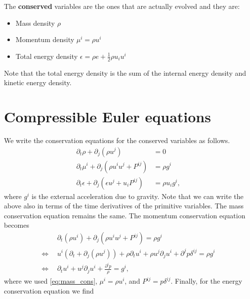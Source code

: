 \documentclass{article}
\begin{document}
The \textbf{conserved} variables are the ones that are actually evolved and they are:
\begin{itemize}
  \item Mass density $\rho$
  \item Momentum density $\mu^i = \rho u^i$
  \item Total energy density $\epsilon = \rho e + \frac{1}{2}\rho u_i u^i$
\end{itemize}
Note that the total energy density is the sum of the internal energy density and kinetic energy
density.

\section{Compressible Euler equations}

We write the conservation equations for the conserved variables as follows.
\begin{align}
  \label{eq:mass_cons}
  \partial_t \rho + \partial_j(\rho u^j)  & = 0 \\
  \label{eq:mom_cons}
  \partial_t \mu^i + \partial_j(\rho u^i u^j + P^{ij}) & = \rho g^i \\
  \label{eq:ener_cons}
  \partial_t \epsilon + \partial_j(\epsilon u^j + u_i P^{ij}) & = \rho u_i g^i,
\end{align}
where $g^i$ is the external acceleration due to gravity. Note that we can write the above also in
terms of the time derivatives of the primitive variables.
The mass conservation equation  remains the same. The momentum conservation
equation  becomes
\begin{align}
  \label{eq:dtu}
  & \partial_t(\rho u^i)
  + \partial_j(\rho u^i u^j + P^{ij})
  = \rho g^i
  \nonumber \\
  \Leftrightarrow\ \
  & u^i\left(\partial_t + \partial_j(\rho u^j)\right)
  + \rho \partial_t u^i
  + \rho u^j \partial_j u^i
  + \partial^j p \delta^{ij}
  = \rho g^i
  \nonumber \\
  \Leftrightarrow\ \
  & \partial_t u^i
  + u^j \partial_j u^i
  + \frac{\partial^i p}{\rho}
  = g^i,
\end{align}
where we used \cref{eq:mass_cons}, $\mu^i = \rho u^i$, and $P^{ij} = p\delta^{ij}$. Finally, for the
energy conservation equation  we find
\end{document}
